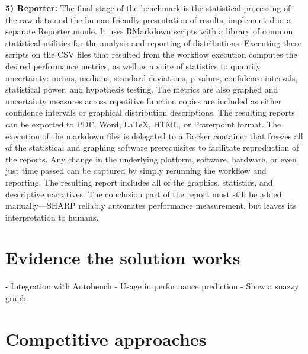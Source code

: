 \documentclass[11pt]{article}
\begin{document}
\textbf{5) Reporter:}
The final stage of the benchmark is the statistical processing of the raw data and the human-friendly presentation of results, implemented in a separate Reporter moule.
It uses RMarkdown scripts with a library of common statistical utilities for the analysis and reporting of distributions.
Executing these scripts on the CSV files that resulted from the workflow execution computes the desired performance metrics, as well as a suite of statistics to quantify uncertainty: means, medians, standard deviations, p-values, confidence intervals, statistical power, and hypothesis testing.
The metrics are also graphed and uncertainty measures across repetitive function copies are included as either confidence intervals or graphical distribution descriptions.
The resulting reports can be exported to PDF, Word, LaTeX, HTML, or Powerpoint format.
The execution of the markdown files is delegated to a Docker container that freezes all of the statistical and graphing software prerequisites to facilitate reproduction of the reports.
Any change in the underlying platform, software, hardware, or even just time passed can be captured by simply rerunning the workflow and reporting.
The resulting report includes all of the graphics, statistics, and descriptive narratives.
The conclusion part of the report must still be added manually---SHARP reliably automates performance measurement, but leaves its interpretation to humans.


\section*{Evidence the solution works}


- Integration with Autobench
- Usage in performance prediction
- Show a snazzy graph.

\section*{Competitive approaches}
\end{document}
